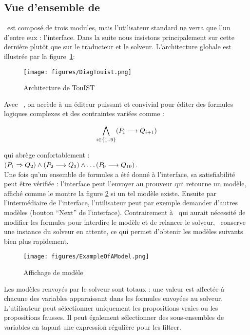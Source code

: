 \subsection{Vue d'ensemble de \touist}\label{sec:sat_interface}


\touist\ est composé de trois modules, mais l'utilisateur standard ne verra que l'un d'entre eux : l'interface. Dans la suite nous insistons principalement sur cette dernière plutôt que sur le traducteur et le solveur. L'architecture globale est illustrée par la figure~\ref{fig:architectureTouisT}: 

\begin{figure}[htbp]
\centering
\texttt{[image: figures/DiagTouist.png]}
  \caption{Architecture de TouIST}
  \label{fig:architectureTouisT}
\end{figure}

Avec \touist\ , on accède à un éditeur puissant et convivial pour éditer des formules logiques complexes et des contraintes variées comme :

$$\bigwedge_{i \in \{1..9\}} (P_i \longrightarrow Q_{i+1})$$

qui abrège confortablement :\\ 

$(P_1 \Rightarrow Q_2) \wedge (P_2 \longrightarrow Q_3) \wedge \ldots (P_9\longrightarrow Q_{10})$. 
\\

Une fois qu'un ensemble de formules a été donné à l'interface, sa satisfiabilité peut être vérifiée : l'interface peut l'envoyer au prouveur qui retourne un modèle, affiché comme le montre la figure \ref{fig:ExampleOfAModel} si un tel modèle existe. Ensuite par l'intermédiaire de l'interface, l'utilisateur peut par exemple demander d'autres modèles (bouton ``Next'' de l'interface). Contrairement à \satoulouse\ qui aurait nécessité de modifier les formules pour interdire le modèle et de relancer le solveur, \touist\ conserve une instance du solveur en attente, ce qui permet d'obtenir les modèles suivants bien plus rapidement.

\begin{figure}[htbp]
\centering
\texttt{[image: figures/ExampleOfAModel.png]}
  \caption{Affichage de modèle}
  \label{fig:ExampleOfAModel}
\end{figure}

Les modèles renvoyés par le solveur sont totaux : une valeur est affectée à chacune des variables apparaissant dans les formules envoyées au solveur. L'utilisateur peut sélectionner uniquement les propositions vraies ou les propositions fausses. Il peut également sélectionner des sous-ensembles de variables en tapant une expression régulière pour les filtrer.
